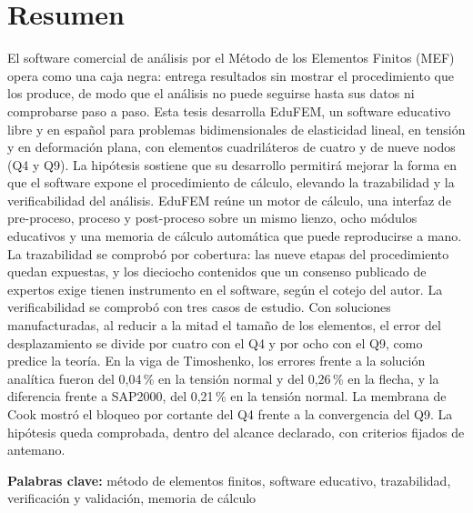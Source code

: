 \chapter*{Resumen}

El software comercial de análisis por el Método de los Elementos Finitos (MEF) opera como una caja negra: entrega resultados sin mostrar el procedimiento que los produce, de modo que el análisis no puede seguirse hasta sus datos ni comprobarse paso a paso. Esta tesis desarrolla EduFEM, un software educativo libre y en español para problemas bidimensionales de elasticidad lineal, en tensión y en deformación plana, con elementos cuadriláteros de cuatro y de nueve nodos (Q4 y Q9). La hipótesis sostiene que su desarrollo permitirá mejorar la forma en que el software expone el procedimiento de cálculo, elevando la trazabilidad y la verificabilidad del análisis. EduFEM reúne un motor de cálculo, una interfaz de pre-proceso, proceso y post-proceso sobre un mismo lienzo, ocho módulos educativos y una memoria de cálculo automática que puede reproducirse a mano. La trazabilidad se comprobó por cobertura: las nueve etapas del procedimiento quedan expuestas, y los dieciocho contenidos que un consenso publicado de expertos exige tienen instrumento en el software, según el cotejo del autor. La verificabilidad se comprobó con tres casos de estudio. Con soluciones manufacturadas, al reducir a la mitad el tamaño de los elementos, el error del desplazamiento se divide por cuatro con el Q4 y por ocho con el Q9, como predice la teoría. En la viga de Timoshenko, los errores frente a la solución analítica fueron del 0,04\,\% en la tensión normal y del 0,26\,\% en la flecha, y la diferencia frente a SAP2000, del 0,21\,\% en la tensión normal. La membrana de Cook mostró el bloqueo por cortante del Q4 frente a la convergencia del Q9. La hipótesis queda comprobada, dentro del alcance declarado, con criterios fijados de antemano.

\noindent\textbf{Palabras clave:} método de elementos finitos, software educativo, trazabilidad, verificación y validación, memoria de cálculo
